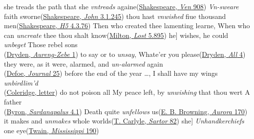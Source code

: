 \ea\label{ex:13-43}
\ea she treads the path that she \emph{vntreads} againe\hfill(\href{https://internetshakespeare.uvic.ca/doc/Ven_Q1/stanza/151~155/index.html#tln-905}{Shakespeare, \textit{Ven} 908})
\ex \emph{Vn-sweare} faith sworne\hfill(\href{https://internetshakespeare.uvic.ca/doc/Jn_F1/scene/3.1/index.html#tln-1175}{Shakespeare, \textit{John} 3.1.245}) %
\ex thou hast \emph{vnwished} fiue thousand men\hfill(\href{https://internetshakespeare.uvic.ca/doc/H5_F1/scene/4.3/index.html#tln-2320}{Shakespeare, \textit{H5} 4.3.76})
\ex Then who created thee lamenting learne, When who can \emph{uncreate} thee thou shalt know\hfill(\href{https://archive.org/details/poeticalworksofj00miltiala/page/294/mode/2up?ref=ol&view=theater&q=%22Then+who+created+thee+lamenting%22}{Milton, \textit{Lost} 5.895})
\ex {[}he{]} wishes, he could \emph{unbeget} Those rebel sons\\\hfill(\href{https://archive.org/details/aurengzebetraged00dryd_1/page/2/mode/2up?q=unbeget&view=theater}{Dryden, \textit{Aureng-Zebe} 1}) %
\ex to say or to \emph{unsay}, Whate'er you please\hfill(\href{https://archive.org/details/allforloveorworl00indryd/page/62/mode/2up?q=%22unfay%22&view=theater}{Dryden, \textit{All} 4})
\ex they were, as it were, alarmed, and \emph{un-alarmed} again\\\hfill(\href{https://archive.org/details/journalofplaguey1881defo/page/24/mode/2up?view=theater&q=%22alarmed%22}{Defoe, \textit{Journal} 25}) %
\ex before the end of the year {\dots}, I shall have my wings \emph{unbirdlim'd}\\\hfill(\href{https://archive.org/details/collectedletters0001edea/page/586/mode/2up?q=%22before+the+end+of+the+year%22&view=theater}{Coleridge, letter}) %
\ex do not poison all My peace left, by \emph{unwishing} that thou wert A father\\\hfill(\href{https://archive.org/details/in.ernet.dli.2015.285363/page/n467/mode/2up?q=%22do+not+poison%22&view=theater}{Byron, \textit{Sardanapalus} 4.1})
\ex Death quite \emph{unfellows} us\hfill(\href{https://archive.org/details/auroraleighpoem00brow/page/182/mode/2up?q=%22death+quite+unfellows+us%22&view=theater}{E. B. Browning, \textit{Aurora} 170})
\ex it makes and \emph{unmakes} whole worlds\hfill(\href{https://archive.org/details/sartorresartus02unkngoog/page/108/mode/2up?view=theater&q=%22makes+and+unmakes%22}{T. Carlyle, \textit{Sartor} 82})
\ex {[}she{]} \emph{Unhandkerchiefs} one eye\hfill(\href{https://archive.org/details/LifeOnTheMississippi1883MarkTwain/page/n443/mode/2up?q=unhandkerchiefs&view=theater}{Twain, \textit{Mississippi} 190})
\z
\z

